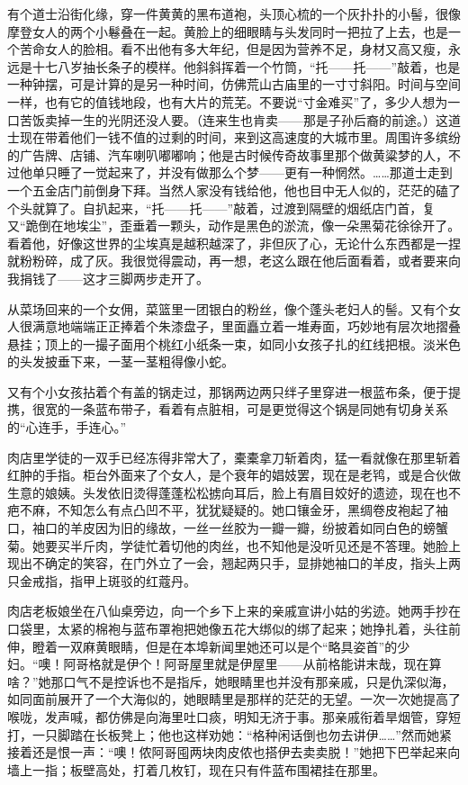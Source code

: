 \par 有个道士沿街化缘，穿一件黄黄的黑布道袍，头顶心梳的一个灰扑扑的小髻，很像摩登女人的两个小鬈叠在一起。黄脸上的细眼睛与头发同时一把拉了上去，也是一个苦命女人的脸相。看不出他有多大年纪，但是因为营养不足，身材又高又瘦，永远是十七八岁抽长条子的模样。他斜斜挥着一个竹筒，“托——托——”敲着，也是一种钟摆，可是计算的是另一种时间，仿佛荒山古庙里的一寸寸斜阳。时间与空间一样，也有它的值钱地段，也有大片的荒芜。不要说“寸金难买”了，多少人想为一口苦饭卖掉一生的光阴还没人要。（连来生也肯卖——那是子孙后裔的前途。）这道士现在带着他们一钱不值的过剩的时间，来到这高速度的大城市里。周围许多缤纷的广告牌、店铺、汽车喇叭嘟嘟响；他是古时候传奇故事里那个做黄粱梦的人，不过他单只睡了一觉起来了，并没有做那么个梦——更有一种惘然。……那道士走到一个五金店门前倒身下拜。当然人家没有钱给他，他也目中无人似的，茫茫的磕了个头就算了。自扒起来，“托——托——”敲着，过渡到隔壁的烟纸店门首，复又“跪倒在地埃尘”，歪垂着一颗头，动作是黑色的淤流，像一朵黑菊花徐徐开了。看着他，好像这世界的尘埃真是越积越深了，非但灰了心，无论什么东西都是一捏就粉粉碎，成了灰。我很觉得震动，再一想，老这么跟在他后面看着，或者要来向我捐钱了——这才三脚两步走开了。
\par 从菜场回来的一个女佣，菜篮里一团银白的粉丝，像个蓬头老妇人的髻。又有个女人很满意地端端正正捧着个朱漆盘子，里面矗立着一堆寿面，巧妙地有层次地摺叠悬挂；顶上的一撮子面用个桃红小纸条一束，如同小女孩子扎的红线把根。淡米色的头发披垂下来，一茎一茎粗得像小蛇。
\par 又有个小女孩拈着个有盖的锅走过，那锅两边两只绊子里穿进一根蓝布条，便于提携，很宽的一条蓝布带子，看着有点脏相，可是更觉得这个锅是同她有切身关系的“心连手，手连心。”
\par 肉店里学徒的一双手已经冻得非常大了，橐橐拿刀斩着肉，猛一看就像在那里斩着红肿的手指。柜台外面来了个女人，是个衰年的娼妓罢，现在是老鸨，或是合伙做生意的娘姨。头发依旧烫得蓬蓬松松掳向耳后，脸上有眉目姣好的遗迹，现在也不疤不麻，不知怎么有点凸凹不平，犹犹疑疑的。她口镶金牙，黑绸卷皮袍起了袖口，袖口的羊皮因为旧的缘故，一丝一丝胶为一瓣一瓣，纷披着如同白色的螃蟹菊。她要买半斤肉，学徒忙着切他的肉丝，也不知他是没听见还是不答理。她脸上现出不确定的笑容，在门外立了一会，翘起两只手，显排她袖口的羊皮，指头上两只金戒指，指甲上斑驳的红蔻丹。
\par 肉店老板娘坐在八仙桌旁边，向一个乡下上来的亲戚宣讲小姑的劣迹。她两手抄在口袋里，太紧的棉袍与蓝布罩袍把她像五花大绑似的绑了起来；她挣扎着，头往前伸，瞪着一双麻黄眼睛，但是在本埠新闻里她还可以是个“略具姿首”的少妇。“噢！阿哥格就是伊个！阿哥屋里就是伊屋里——从前格能讲末哉，现在算啥？”她那口气不是控诉也不是指斥，她眼睛里也并没有那亲戚，只是仇深似海，如同面前展开了一个大海似的，她眼睛里是那样的茫茫的无望。一次一次她提高了喉咙，发声喊，都仿佛是向海里吐口痰，明知无济于事。那亲戚衔着旱烟管，穿短打，一只脚踏在长板凳上；他也这样劝她：“格种闲话倒也勿去讲伊……”然而她紧接着还是恨一声：“噢！侬阿哥囤两块肉皮侬也搭伊去卖卖脱！”她把下巴举起来向墙上一指；板壁高处，打着几枚钉，现在只有件蓝布围裙挂在那里。
